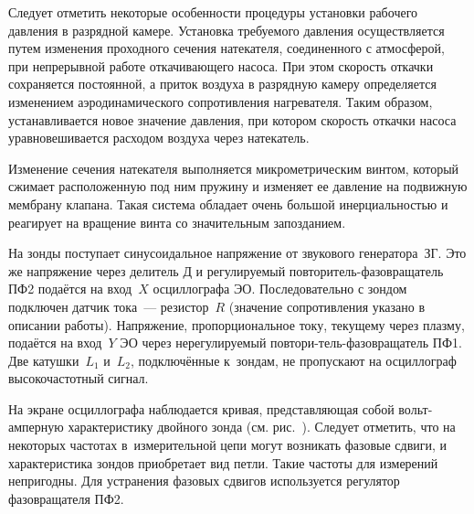 Следует отметить некоторые особенности процедуры установки рабочего давления в
разрядной камере. Установка требуемого давления осуществляется путем изменения
проходного сечения натекателя, соединенного с атмосферой, при непрерывной работе
откачивающего насоса. При этом скорость откачки сохраняется постоянной, а приток
воздуха в разрядную камеру определяется изменением аэродинамического
сопротивления нагревателя. Таким образом, устанавливается новое значение
давления, при котором скорость откачки насоса уравновешивается расходом воздуха
через натекатель.

Изменение сечения натекателя выполняется микрометрическим винтом, который
сжимает расположенную под ним пружину и изменяет ее давление на подвижную
мембрану клапана. Такая система обладает очень большой инерциальностью и
реагирует на вращение винта со значительным запозданием.

На зонды поступает синусоидальное напряжение от звукового генератора~ЗГ.
Это же напряжение через делитель Д и регулируемый повторитель-фазовращатель ПФ2
подаётся на вход~$X$ осциллографа ЭО. Последовательно с зондом подключен датчик
тока~--- резистор~$R$ (значение сопротивления указано в описании работы).
Напряжение, пропорциональное току, текущему через плазму, подаётся на вход~$Y$
ЭО через нерегулируемый повтори-тель-фазовращатель ПФ1. Две катушки~$L_{1}$
и~$L_{2}$, подключённые к~зондам, не пропускают на осциллограф высокочастотный
сигнал.

На экране осциллографа наблюдается кривая, представляющая собой вольт-амперную
характеристику двойного зонда (см. рис.~).
Следует отметить, что на некоторых частотах в~измерительной цепи могут возникать
фазовые сдвиги, и характеристика зондов приобретает вид петли. Такие частоты
для измерений непригодны. Для устранения фазовых сдвигов используется регулятор
фазовращателя ПФ2.


